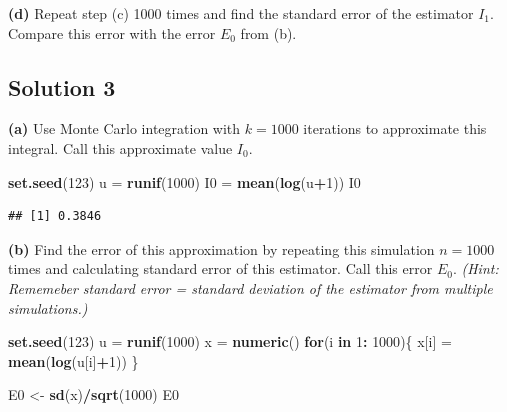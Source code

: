 \documentclass[
]{article}
\newenvironment{Shaded}{\begin{snugshade}}{\end{snugshade}}
\newcommand{\ControlFlowTok}[1]{\textcolor[rgb]{0.13,0.29,0.53}{\textbf{#1}}}
\newcommand{\DecValTok}[1]{\textcolor[rgb]{0.00,0.00,0.81}{#1}}
\newcommand{\KeywordTok}[1]{\textcolor[rgb]{0.13,0.29,0.53}{\textbf{#1}}}
\newcommand{\NormalTok}[1]{#1}
\newcommand{\OperatorTok}[1]{\textcolor[rgb]{0.81,0.36,0.00}{\textbf{#1}}}
\newcommand{\StringTok}[1]{\textcolor[rgb]{0.31,0.60,0.02}{#1}}
\begin{document}
\textbf{(d)} Repeat step (c) 1000 times and find the standard error of
the estimator \(I_1\). Compare this error with the error \(E_0\) from
(b).

\hypertarget{solution-3}{%
\subsection{Solution 3}\label{solution-3}}

\textbf{(a)} Use Monte Carlo integration with \(k = 1000\) iterations to
approximate this integral. Call this approximate value \(I_0\).

\begin{Shaded}
\begin{Highlighting}[]
\KeywordTok{set.seed}\NormalTok{(}\DecValTok{123}\NormalTok{)}
\NormalTok{u =}\StringTok{ }\KeywordTok{runif}\NormalTok{(}\DecValTok{1000}\NormalTok{)}
\NormalTok{I0 =}\StringTok{ }\KeywordTok{mean}\NormalTok{(}\KeywordTok{log}\NormalTok{(u}\OperatorTok{+}\DecValTok{1}\NormalTok{))}
\NormalTok{I0}
\end{Highlighting}
\end{Shaded}

\begin{verbatim}
## [1] 0.3846
\end{verbatim}

\textbf{(b)} Find the error of this approximation by repeating this
simulation \(n = 1000\) times and calculating standard error of this
estimator. Call this error \(E_0\). \emph{(Hint: Rememeber standard
error = standard deviation of the estimator from multiple simulations.)}

\begin{Shaded}
\begin{Highlighting}[]
\KeywordTok{set.seed}\NormalTok{(}\DecValTok{123}\NormalTok{)}
\NormalTok{u =}\StringTok{ }\KeywordTok{runif}\NormalTok{(}\DecValTok{1000}\NormalTok{)}
\NormalTok{x =}\StringTok{ }\KeywordTok{numeric}\NormalTok{()}
\ControlFlowTok{for}\NormalTok{(i }\ControlFlowTok{in} \DecValTok{1}\OperatorTok{:}\StringTok{ }\DecValTok{1000}\NormalTok{)\{}
\NormalTok{  x[i] =}\StringTok{ }\KeywordTok{mean}\NormalTok{(}\KeywordTok{log}\NormalTok{(u[i]}\OperatorTok{+}\DecValTok{1}\NormalTok{))}
\NormalTok{\}}

\NormalTok{E0 <-}\StringTok{ }\KeywordTok{sd}\NormalTok{(x)}\OperatorTok{/}\KeywordTok{sqrt}\NormalTok{(}\DecValTok{1000}\NormalTok{)}
\NormalTok{E0}
\end{Highlighting}
\end{Shaded}
\end{document}
